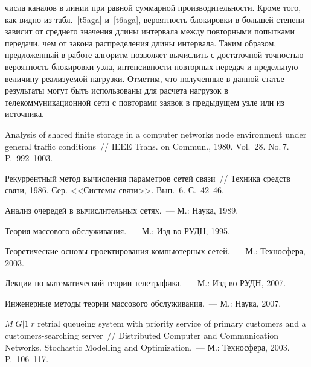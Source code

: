 \begin{multicols}{2}


\noindent
числа каналов в линии при равной суммарной 
производительности. Кроме того, как видно из табл.~\ref{t5aga} и~\ref{t6aga}, 
вероятность блокировки в большей степени зависит от среднего значения 
длины интервала между повторными попытками передачи, чем от закона 
распределения длины интервала. Таким образом, предложенный в работе 
алгоритм позволяет вы\-чис\-лить с достаточной точностью вероятность 
блокировки узла, интенсивности повторных передач и предельную величину 
реализуемой нагрузки. Отметим, что полученные в данной статье результаты 
могут быть использованы для расчета нагрузок в телекоммуникационной сети с 
повторами заявок в предыдущем узле или из источника. 


{\small\frenchspacing
{%
\begin{thebibliography}{99}    
Analysis of shared finite storage in a computer networks node environment under 
general traffic conditions~// IEEE Trans. on Commun., 1980. Vol.~28. No.\,7. 
P.~992--1003.

Рекуррентный метод вычисления параметров сетей связи~// Техника средств 
связи, 1986. Сер. <<Системы связи>>. Вып.~6. С.~42--46.

Анализ очередей в вычислительных сетях.~--- М.: Наука, 1989. 

Теория массового обслуживания.~--- М.: Изд-во РУДН, 1995. 

Теоретические основы проектирования компьютерных сетей.~--- М.: 
Техносфера, 2003. 

Лекции по математической теории телетрафика.~--- М.: Изд-во РУДН, 2007. 

Инженерные методы теории массового обслуживания.~--- М.: Наука, 2007.

$M\vert G\vert 1\vert r$ retrial queueing system with priority service of primary 
customers and a customers-searching server~// Distributed Computer and 
Communication Networks. Stochastic Modelling and Optimization.~--- М.: 
Техносфера, 2003. P.~106--117.


\end{thebibliography}}}
\end{multicols}
